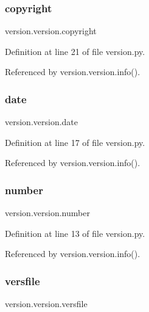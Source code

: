 \subsubsection{\texorpdfstring{copyright}{copyright}}
{\footnotesize\ttfamily version.\+version.\+copyright}



Definition at line 21 of file version.\+py.



Referenced by version.\+version.\+info().

\mbox{\label{classversion_1_1version_a13223788120e350890af3fb0dcd1b260}} 
\subsubsection{\texorpdfstring{date}{date}}
{\footnotesize\ttfamily version.\+version.\+date}



Definition at line 17 of file version.\+py.



Referenced by version.\+version.\+info().

\mbox{\label{classversion_1_1version_af4cef468b0397eb1728ceaf65a31ce14}} 
\subsubsection{\texorpdfstring{number}{number}}
{\footnotesize\ttfamily version.\+version.\+number}



Definition at line 13 of file version.\+py.



Referenced by version.\+version.\+info().

\mbox{\label{classversion_1_1version_a1b3a3618376b629cb88066864c489a3c}} 
\subsubsection{\texorpdfstring{versfile}{versfile}}
{\footnotesize\ttfamily version.\+version.\+versfile}



